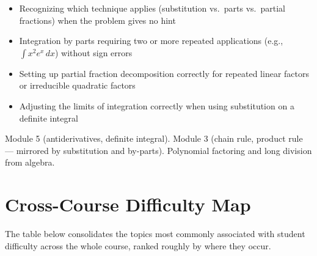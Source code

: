 \documentclass[11pt]{article}
\begin{document}
\begin{diffbox}
\begin{itemize}[nosep]
  \item Recognizing which technique applies (substitution vs.\ parts vs.\ partial fractions) when the problem gives no hint
  \item Integration by parts requiring two or more repeated applications (e.g., $\int x^2 e^x\,dx$) without sign errors
  \item Setting up partial fraction decomposition correctly for repeated linear factors or irreducible quadratic factors
  \item Adjusting the limits of integration correctly when using substitution on a definite integral
\end{itemize}
\end{diffbox}

\begin{prereqbox}
Module 5 (antiderivatives, definite integral). Module 3 (chain rule, product rule ---
mirrored by substitution and by-parts). Polynomial factoring and long division from
algebra.
\end{prereqbox}

\section{Cross-Course Difficulty Map}

The table below consolidates the topics most commonly associated with student
difficulty across the whole course, ranked roughly by where they occur.
\end{document}
